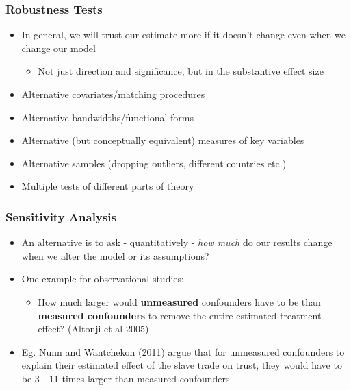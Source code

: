 \documentclass[xcolor=x11names,compress]{beamer}\usepackage[]{graphicx}\usepackage[]{color}
\renewcommand{\(}{\begin{columns}}
\renewcommand{\)}{\end{columns}}
\newcommand{\<}[1]{\begin{column}{#1}}
\renewcommand{\>}{\end{column}}
\begin{document}
\begin{frame}
\frametitle{Robustness Tests}
\begin{itemize}
\item In general, we will trust our estimate more if it doesn't change even when we change our model
\pause
\begin{itemize}
\item Not just direction and significance, but in the substantive effect size
\pause
\end{itemize}
\item Alternative covariates/matching procedures
\pause
\item Alternative bandwidths/functional forms
\pause
\item Alternative (but conceptually equivalent) measures of key variables
\pause
\item Alternative samples (dropping outliers, different countries etc.)
\pause
\item Multiple tests of different parts of theory
\end{itemize}
\end{frame}

\begin{frame}
\frametitle{Sensitivity Analysis}
\begin{itemize}
\item An alternative is to ask - quantitatively - \textit{how much} do our results change when we alter the model or its assumptions?
\pause
\item One example for observational studies:
\begin{itemize}
\item How much larger would \textbf{unmeasured} confounders have to be than \textbf{measured confounders} to remove the entire estimated treatment effect? (Altonji et al 2005)
\pause
\end{itemize}
\item Eg. Nunn and Wantchekon (2011) argue that for unmeasured confounders to explain their estimated effect of the slave trade on trust, they would have to be 3 - 11 times larger than measured confounders
\end{itemize}
\end{frame}
\end{document}
